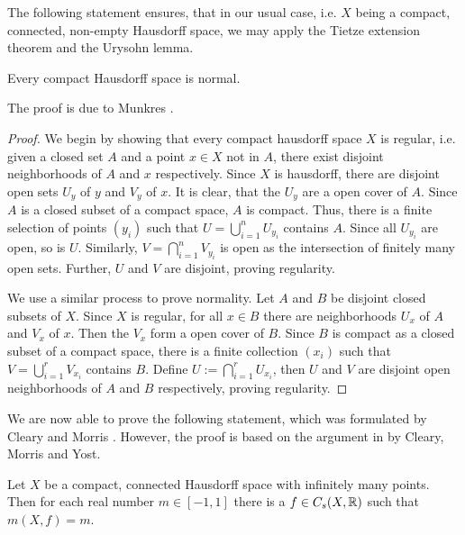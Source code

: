 The following statement ensures, that in our usual case, i.e. $X$ being a compact, connected, non-empty Hausdorff space, we may apply the Tietze extension theorem and the Urysohn lemma.
\begin{lemma}
	Every compact Hausdorff space is normal. 
\end{lemma}
The proof is due to Munkres \cite[p. 202]{munkres:topology}.
\begin{proof}
	We begin by showing that every compact hausdorff space $X$ is regular, i.e. given a closed set $A$ and a point $x\in X$ not in $A$, there exist disjoint neighborhoods of $A$ and $x$ respectively. Since $X$ is hausdorff, there are disjoint open sets $U_y$ of $y$ and $V_y$ of $x$. It is clear, that the $U_y$ are a open cover of $A$. Since $A$ is a closed subset of a compact space, $A$ is compact. Thus, there is a finite selection of points $(y_i)$ such that $U=\bigcup\limits_{i=1}^n U_{y_i}$ contains $A$. Since all $U_{y_i}$ are open, so is $U$. Similarly, $V=\bigcap\limits_{i=1}^n V_{y_i}$ is open as the intersection of finitely many open sets. Further, $U$ and $V$ are disjoint, proving regularity.
	
	We use a similar process to prove normality. Let $A$ and $B$ be disjoint closed subsets of $X$. Since $X$ is regular, for all $x\in B$ there are neighborhoods $U_x$ of $A$ and $V_x$ of $x$. Then the $V_x$ form a open cover of $B$. Since $B$ is compact as a closed subset of a compact space, there is a finite collection $(x_i)$ such that $V=\bigcup\limits_{i=1}^rV_{x_i}$ contains $B$. Define $U:=\bigcap\limits_{i=1}^rU_{x_i}$, then $U$ and $V$ are disjoint open neighborhoods of $A$ and $B$ respectively, proving regularity.
\end{proof}

We are now able to prove the following statement, which was formulated by Cleary and Morris \cite{cleary-morris}. However, the proof is based on the argument in \cite{cleary:numbers-of-shapes} by Cleary, Morris and Yost.
\begin{theorem}\label{thm:every-m-possible}
	Let $X$ be a compact, connected Hausdorff space with infinitely many points. Then for each real number $m\in[-1,1]$ there is a $f\in C_s(X,\mathbb{R})$ such that $m(X,f)=m$.
\end{theorem}

